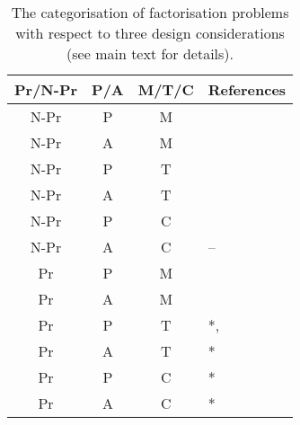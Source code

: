 
\begin{table}[t]
\centering
\caption{\label{tbl:relatedwork}The categorisation of factorisation problems with respect to
three design considerations (see main text for details).}
\vskip 0.15in
\small
\begin{tabular}{c c c l}
Pr/N-Pr & P/A & M/T/C & References	\\ \hline \hline

N-Pr & P & M & \cite{lee1999learning}\\ \hline
N-Pr & A & M & \cite{ruchansky2015matrix}\\  \hline

N-Pr & P & T& \cite{nickel2011three}\cite{kolda2009tensor}\\ \hline
N-Pr & A & T & \cite{kajino2015active} \\  \hline
N-Pr & P & C & \cite{Neelakantan2015}\cite{guu2015traversing}\\ \hline
N-Pr & A & C & -- \\ \hline
Pr & P & M & \cite{mnih2007probabilistic}\\ \hline
Pr & A & M&  \cite{kawale2015efficient}\cite{sutherland2013active}\\ \hline

Pr & P & T& *, \cite{xiong2010temporal}\cite{schmidt2009probabilistic} \\ \hline
Pr & A & T & * \\ \hline
Pr & P & C & * \\ \hline
Pr & A & C & *
\end{tabular}
\end{table}
